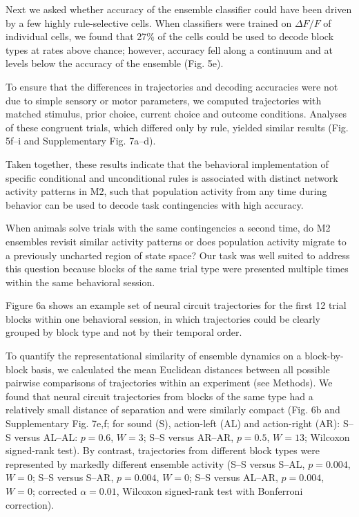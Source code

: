 Next we asked whether accuracy of the ensemble classifier could have been driven by a few highly rule-selective cells. When classifiers were trained on $\Delta F/F$ of individual cells, we found that 27\% of the cells could be used to decode block types at rates above chance; however, accuracy fell along a continuum and at levels below the accuracy of the ensemble (Fig. 5e). 

To ensure that the differences in trajectories and decoding accuracies were not due to simple sensory or motor parameters, we computed trajectories with matched stimulus, prior choice, current choice and outcome conditions. Analyses of these congruent trials, which differed only by rule, yielded similar results (Fig. 5f–i and Supplementary Fig. 7a–d). 

Taken together, these results indicate that the behavioral implementation of specific conditional and unconditional rules is associated with distinct network activity patterns in M2, such that population activity from any time during behavior can be used to decode task contingencies with high accuracy.

When animals solve trials with the same contingencies a second time, do M2 ensembles revisit similar activity patterns or does population activity migrate to a previously uncharted region of state space? Our task was well suited to address this question because blocks of the same trial type were presented multiple times within the same behavioral session. 

Figure 6a shows an example set of neural circuit trajectories for the first 12 trial blocks within one behavioral session, in which trajectories could be clearly grouped by block type and not by their temporal order. 


To quantify the representational similarity of ensemble dynamics on a block-by-block basis, we calculated the mean Euclidean distances between all possible pairwise comparisons of trajectories within an experiment (see Methods). We found that neural circuit trajectories from blocks of the same type had a relatively small distance of separation and were similarly compact (Fig. 6b and Supplementary Fig. 7e,f; for sound (S), action-left (AL) and action-right (AR): S–S versus AL–AL: $p = 0.6$, $W = 3$; S–S versus AR–AR, $p = 0.5$, $W = 13$; Wilcoxon signed-rank test). By contrast, trajectories from different block types were represented by markedly different ensemble activity (S–S versus S–AL, $p = 0.004$, $W = 0$; S–S versus S–AR, $p = 0.004$, $W = 0$; S–S versus AL–AR, $p = 0.004$, $W = 0$; corrected $\alpha = 0.01$, Wilcoxon signed-rank test with Bonferroni correction). 

